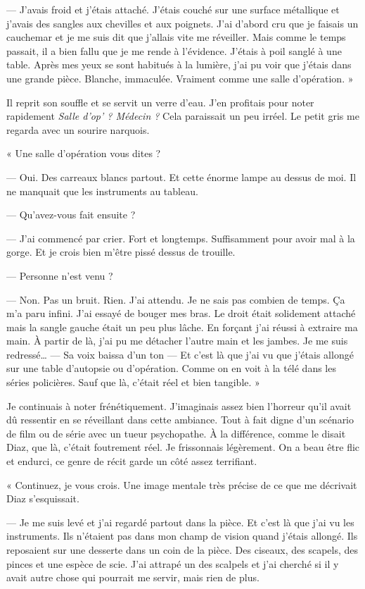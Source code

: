 — J'avais froid et j'étais attaché. J'étais couché sur une surface métallique et j'avais des sangles aux chevilles et
aux poignets. J'ai d'abord cru que je faisais un cauchemar et je me suis dit que j'allais vite me réveiller. Mais comme
le temps passait, il a bien fallu que je me rende à l'évidence. J'étais à poil sanglé à une table. Après mes yeux se
sont habitués à la lumière, j'ai pu voir que j'étais dans une grande pièce. Blanche, immaculée. Vraiment comme une
salle d'opération. »

Il reprit son souffle et se servit un verre d'eau. J'en profitais pour noter rapidement \emph{Salle d'op' ? Médecin ?}
Cela paraissait un peu irréel. Le petit gris me regarda avec un sourire narquois.

« Une salle d'opération vous dites ?

— Oui. Des carreaux blancs partout. Et cette énorme lampe au dessus de moi. Il ne manquait que les instruments au
tableau.

— Qu'avez-vous fait ensuite ?

— J'ai commencé par crier. Fort et longtemps. Suffisamment pour avoir mal à la gorge. Et je crois bien m'être pissé
dessus de trouille.

— Personne n'est venu ?

— Non. Pas un bruit. Rien. J'ai attendu. Je ne sais pas combien de temps. Ça m'a paru infini. J'ai essayé de bouger mes
bras. Le droit était solidement attaché mais la sangle gauche était un peu plus lâche. En forçant j'ai réussi à
extraire ma main. À partir de là, j'ai pu me détacher l'autre main et les jambes. Je me suis redressé… — Sa voix baissa
d'un ton — Et c'est là que j'ai vu que j'étais allongé sur une table d'autopsie ou d'opération. Comme on en voit à la
télé dans les séries policières. Sauf que là, c'était réel et bien tangible. »

Je continuais à noter frénétiquement. J'imaginais assez bien l'horreur qu'il avait dû ressentir en se réveillant dans
cette ambiance. Tout à fait digne d'un scénario de film ou de série avec un tueur psychopathe. À la différence, comme
le disait Diaz, que là, c'était foutrement réel. Je frissonnais légèrement. On a beau être flic et endurci, ce genre de
récit garde un côté assez terrifiant.

« Continuez, je vous crois. Une image mentale très précise de ce que me décrivait Diaz s'esquissait.

— Je me suis levé et j'ai regardé partout dans la pièce. Et c'est là que j'ai vu les instruments. Ils n'étaient pas
dans mon champ de vision quand j'étais allongé. Ils reposaient sur une desserte dans un coin de la pièce. Des ciseaux,
des scapels, des pinces et une espèce de scie. J'ai attrapé un des scalpels et j'ai cherché si il y avait autre chose
qui pourrait me servir, mais rien de plus.

